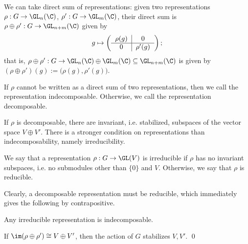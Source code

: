 We can take direct sum of representations: given two representations $\rho: G \to \GL_n(\C)$, $\rho': G \to \GL_m(\C)$, their direct sum is $\rho \oplus \rho' : G \to \GL_{n+m}(\C)$ given by 
	\[
	g \mapsto \left(\begin{tabular}{c|c} $\rho(g)$ & 0 \\ \hline 0 & $\rho'(g)$ \end{tabular}\right);
	\]
that is, $\rho \oplus \rho': G \to \GL_n(\C) \oplus \GL_m(\C) \subseteq \GL_{n+m}(\C)$ is given by $(\rho \oplus \rho')(g):= \big(\rho(g), \rho'(g)\big)$. 


\begin{dfn}[Indecomposable]
If $\rho$ cannot be written as a direct sum of two representations, then we call the representation indecomposable. Otherwise, we call the representation decomposable. 
\end{dfn}


If $\rho$ is decomposable, there are invariant, i.e. stabilized, subspaces of the vector space $V \oplus V'$. There is a stronger condition on representations than indecomposability, namely irreducibility. 


\begin{dfn}[Irreducible]
We say that a representation $\rho: G \to \GL(V)$ is irreducible if $\rho$ has no invariant subspaces, i.e. no submodules other than $\{0\}$ and $V$. Otherwise, we say that $\rho$ is reducible.
\end{dfn}


Clearly, a decomposable representation must be reducible, which immediately gives the following by contrapositive. 


\begin{thm}
Any irreducible representation is indecomposable. 
\end{thm}

\pf If $\im (\rho \oplus \rho') \cong V \oplus V'$, then the action of $G$ stabilizes $V, V'$. \qed \\


